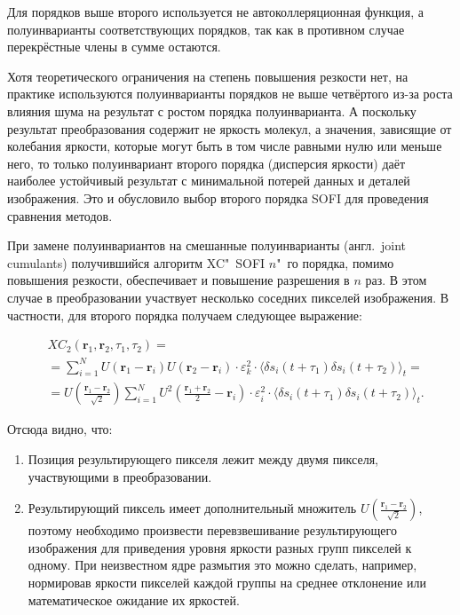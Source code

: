 Для порядков выше второго используется не автоколлеряционная функция, а полуинварианты соответствующих порядков, так как в противном случае перекрёстные члены в сумме остаются.

Хотя теоретического ограничения на степень повышения резкости нет, на практике используются полуинварианты порядков не выше четвёртого из-за роста влияния шума на результат с ростом порядка полуинварианта. А поскольку результат преобразования содержит не яркость молекул, а значения, зависящие от колебания яркости, которые могут быть в том числе равными нулю или меньше него, то только полуинвариант второго порядка (дисперсия яркости) даёт наиболее устойчивый результат с минимальной потерей данных и деталей изображения. Это и обусловило выбор второго порядка SOFI для проведения сравнения методов.

При замене полуинвариантов на смешанные полуинварианты (англ.~joint cumulants) получившийся алгоритм XC"~SOFI $n$"~го порядка, помимо повышения резкости, обеспечивает и повышение разрешения в $n$ раз. В этом случае в преобразовании участвует несколько соседних пикселей изображения. В частности, для второго порядка получаем следующее выражение:

\begin{align*}
	&{XC}_2\left(\mathbf{r}_1,\mathbf{r}_2,\tau_1,\tau_2\right) = \\
	&= \sum_{i=1}^{N} {U\left(\mathbf{r}_1-\mathbf{r}_i\right)U\left(\mathbf{r}_2-\mathbf{r}_i\right)\cdot\varepsilon_k^2\cdot \langle \delta s_i\left(t+\tau_1\right)\delta s_i\left(t+\tau_2\right) \rangle_t} = \\
	&= U\left(\frac{\mathbf{r}_1-\mathbf{r}_2}{\sqrt2}\right) \sum_{i=1}^{N} {U^2\left(\frac{\mathbf{r}_1+\mathbf{r}_2}{2}-\mathbf{r}_i\right)\cdot\varepsilon_i^2\cdot \langle \delta s_i\left(t+\tau_1\right)\delta s_i\left(t+\tau_2\right) \rangle_t}.
\end{align*}

Отсюда видно, что:

\begin{enumerate}[beginpenalty=10000]
	\item Позиция результирующего пикселя лежит между двумя пикселя, участвующими в преобразовании.
	\item Результирующий пиксель имеет дополнительный множитель $U\left(\frac{\mathbf{r}_1-\mathbf{r}_2}{\sqrt2}\right)$, поэтому необходимо произвести перевзвешивание результирующего изображения для приведения уровня яркости разных групп пикселей к одному. При неизвестном ядре размытия это можно сделать, например, нормировав яркости пикселей каждой группы на среднее отклонение или математическое ожидание их яркостей.
\end{enumerate}


